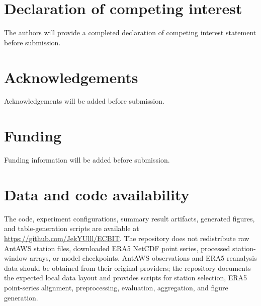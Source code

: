 \documentclass[preprint,12pt,authoryear]{elsarticle}
\begin{document}
\section*{Declaration of competing interest}
The authors will provide a completed declaration of competing interest statement before submission.

\section*{Acknowledgements}
Acknowledgements will be added before submission.

\section*{Funding}
Funding information will be added before submission.

\section*{Data and code availability}
The code, experiment configurations, summary result artifacts, generated figures, and table-generation scripts are available at \url{https://github.com/JekYUlll/ECBIT}. The repository does not redistribute raw AntAWS station files, downloaded ERA5 NetCDF point series, processed station-window arrays, or model checkpoints. AntAWS observations and ERA5 reanalysis data should be obtained from their original providers; the repository documents the expected local data layout and provides scripts for station selection, ERA5 point-series alignment, preprocessing, evaluation, aggregation, and figure generation.




\appendix

\end{document}
